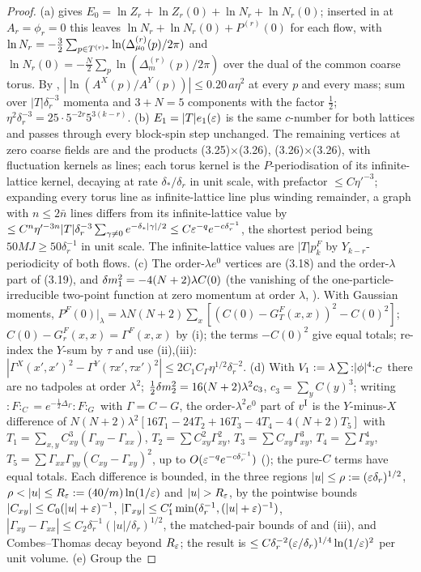 \begin{proof}
(a) \cite[(3.89)]{K1} gives $E_0=\ln Z_r+\ln Z_r(0)+\ln N_r+\ln N_r(0)$; inserted in \cite[(3.14)]{K1} at $A_r=\phi_r=0$ this leaves $\ln N_r+\ln N_r(0)+P^{(r)}(0)$ for each flow, with $\ln N_r=-\frac32\sum_{p\in T^{(r)*}}\ln(\Delta^{(r)}_{\mu_0}(p)/2\pi)$ and $\ln N_r(0)=-\frac N2\sum_p\ln(\Delta^{(r)}_m(p)/2\pi)$ over the dual of the common coarse torus. By , $|\ln(A^X(p)/A^Y(p))|\le0.20\,a\eta^2$ at every $p$ and every mass; sum over $|T|\delta_r^{-3}$ momenta and $3+N=5$ components with the factor $\frac12$; $\eta^2\delta_r^{-3}=25\cdot5^{-2r}5^{3(k-r)}$. (b) $E_1=|T|e_1(\varepsilon)$ is the same $c$-number for both lattices and passes through every block-spin step unchanged. The remaining vertices at zero coarse fields are \cite[(3.18), (3.19), (3.22), (3.23)]{K1} and the products (3.25)$\times$(3.26), (3.26)$\times$(3.26), with fluctuation kernels as lines; each torus kernel is the $P$-periodisation of its infinite-lattice kernel, decaying at rate $\delta_*/\delta_r$ in unit scale, with prefactor $\le C\eta'^{-3}$; expanding every torus line as infinite-lattice line plus winding remainder, a graph with $n\le2\bar n$ lines differs from its infinite-lattice value by $\le C^n\eta'^{-3n}|T|\delta_r^{-3}\sum_{\gamma\ne0}e^{-\delta_*|\gamma|/2}\le C\varepsilon^{-q}e^{-c\delta_r^{-1}}$, the shortest period being $50MJ\ge50\delta_r^{-1}$ in unit scale. The infinite-lattice values are $|T|p^F_k$ by $Y_{k-r}$-periodicity of both flows. (c) The order-$\lambda e^0$ vertices are (3.18) and the order-$\lambda$ part of (3.19), and $\delta m^2_1=-4(N+2)\lambda C(0)$ (the vanishing of the one-particle-irreducible two-point function at zero momentum at order $\lambda$, \cite[(3.33)]{K1}). With Gaussian moments, $P^F(0)|_\lambda=\lambda N(N+2)\sum_x[(C(0)-G^F_T(x,x))^2-C(0)^2]$; $C(0)-G^F_r(x,x)=\Gamma^F(x,x)$ by (i); the terms $-C(0)^2$ give equal totals; re-index the $Y$-sum by $\tau$ and use (ii),(iii): $|\Gamma^X(x',x')^2-\Gamma^Y(\tau x',\tau x')^2|\le2C_1C_\Gamma\eta^{1/2}\delta_r^{-2}$. (d) With $V_1:=\lambda\sum{:}|\phi|^4{:}_C$ there are no tadpoles at order $\lambda^2$; $\frac12\delta m^2_2=16(N+2)\lambda^2c_3$, $c_3=\sum_yC(y)^3$; writing ${:}F{:}_C=e^{-\frac12\Delta_\Gamma}{:}F{:}_G$ with $\Gamma=C-G$, the order-$\lambda^2e^0$ part of $v^{\rm I}$ is the $Y$-minus-$X$ difference of $N(N+2)\lambda^2[16T_1-24T_2+16T_3-4T_4-4(N+2)T_5]$ with $T_1=\sum_{x,y}C_{xy}^3(\Gamma_{xy}-\Gamma_{xx})$, $T_2=\sum C^2_{xy}\Gamma^2_{xy}$, $T_3=\sum C_{xy}\Gamma^3_{xy}$, $T_4=\sum\Gamma^4_{xy}$, $T_5=\sum\Gamma_{xx}\Gamma_{yy}(C_{xy}-\Gamma_{xy})^2$, up to $O(\varepsilon^{-q}e^{-c\delta_r^{-1}})$ (); the pure-$C$ terms have equal totals. Each difference is bounded, in the three regions $|u|\le\rho:=(\varepsilon\delta_r)^{1/2}$, $\rho<|u|\le R_\eps\defeq(40/m)\ln(1/\eps)$ and $|u|>R_\eps$, by the pointwise bounds $|C_{xy}|\le C_0(|u|+\varepsilon)^{-1}$, $|\Gamma_{xy}|\le C'_1\min(\delta_r^{-1},(|u|+\varepsilon)^{-1})$, $|\Gamma_{xy}-\Gamma_{xx}|\le C_2\delta_r^{-1}(|u|/\delta_r)^{1/2}$, the matched-pair bounds of  and (iii), and Combes--Thomas decay beyond $R_{\varepsilon}$; the result is $\le C\delta_r^{-2}(\varepsilon/\delta_r)^{1/4}\ln(1/\varepsilon)^2$ per unit volume. (e) Group the 
\end{proof}
